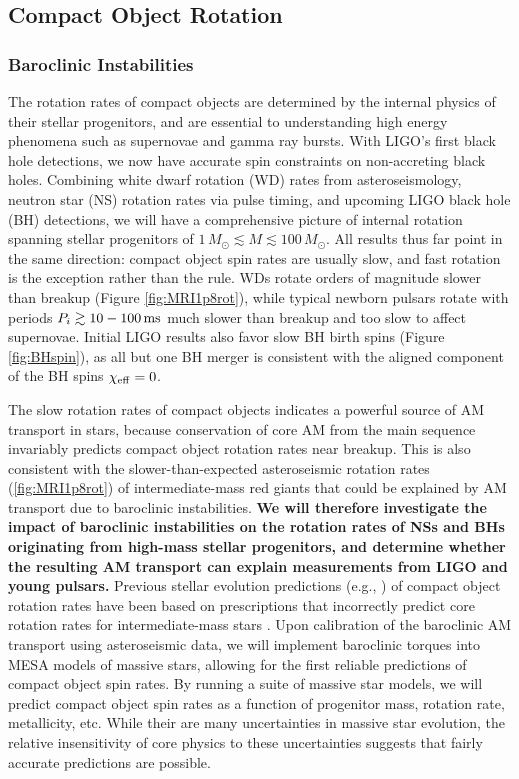 {\color{orange}

\subsection{Compact Object Rotation}

}

\subsubsection{Baroclinic Instabilities}

The rotation rates of compact objects are determined by the internal physics of their stellar progenitors, and are essential to understanding high energy phenomena such as supernovae and gamma ray bursts. With LIGO's first black hole detections, we now have accurate spin constraints on non-accreting black holes. Combining white dwarf rotation (WD) rates from asteroseismology, neutron star (NS) rotation rates via pulse timing, and upcoming LIGO black hole (BH) detections, we will have a comprehensive picture of internal rotation spanning stellar progenitors of $1 \, M_\odot \! \lesssim \! M \! \lesssim \! 100 \, M_\odot$. All results thus far point in the same direction: compact object spin rates are usually slow, and fast rotation is the exception rather than the rule. WDs rotate orders of magnitude slower than breakup (Figure \ref{fig:MRI1p8rot}), while typical newborn pulsars rotate with periods $P_{i} \gtrsim 10-100 \, {\rm ms}$ \citep{faucher:06,igoshev:13,gullon:14} much slower than breakup and too slow to affect  supernovae. Initial LIGO results also favor slow BH birth spins (Figure \ref{fig:BHspin}), as all but one BH merger is consistent with the aligned component of the BH spins $\chi_{\rm eff} = 0$.


The slow rotation rates of compact objects indicates a powerful source of AM transport in stars, because conservation of core AM from the main sequence invariably predicts compact object rotation rates near breakup. This is also consistent with the slower-than-expected asteroseismic rotation rates (\ref{fig:MRI1p8rot}) of intermediate-mass red giants that could be explained by AM transport due to baroclinic instabilities. {\bf We will therefore investigate the impact of baroclinic instabilities on the rotation rates of NSs and BHs originating from high-mass stellar progenitors, and determine whether the resulting AM transport can explain measurements from LIGO and young pulsars.} Previous stellar evolution predictions (e.g., \citealt{heger:00}) of compact object rotation rates have been based on prescriptions that incorrectly predict core rotation rates for intermediate-mass stars \citep{cantiello:14}. Upon calibration of the baroclinic AM transport using asteroseismic data, we will implement baroclinic torques into MESA models of massive stars, allowing for the first reliable predictions of compact object spin rates. By running a suite of massive star models, we will predict compact object spin rates as a function of progenitor mass, rotation rate, metallicity, etc. While their are many uncertainties in massive star evolution, the relative insensitivity of core physics to these uncertainties suggests that fairly accurate predictions are possible.

